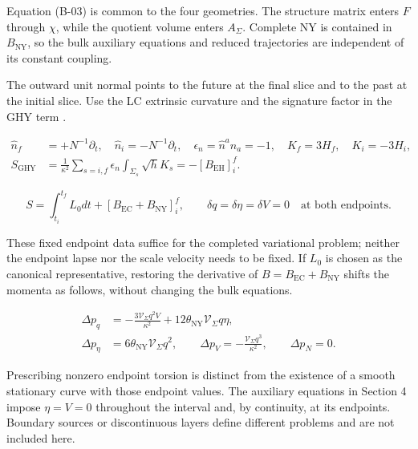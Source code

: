 Equation (B-03) is common to the four geometries. The structure matrix enters $F$ through $\chi$, while the quotient volume enters $A_{\Sigma}$. Complete NY is contained in $B_{\mathrm{NY}}$, so the bulk auxiliary equations and reduced trajectories are independent of its constant coupling.

The outward unit normal points to the future at the final slice and to the past at the initial slice. Use the LC extrinsic curvature and the signature factor in the GHY term \cite{GH1977,HH1996}.

\begin{equation}\tag{B-05}\label{eq:B-05}
\begin{aligned}
\hat n_f&=+N^{-1}\partial_t,\quad \hat n_i=-N^{-1}\partial_t,\quad
\epsilon_n=\hat n^a\hat n_a=-1,\quad K_f=3H_f,\quad K_i=-3H_i,\\
S_{\mathrm{GHY}}&=\frac1{\kappa^2}\sum_{s=i,f}\epsilon_n\int_{\Sigma_s}\sqrt h K_s
=-[B_{\mathrm{EH}}]_i^f.
\end{aligned}
\end{equation}

\begin{equation}\tag{B-06}\label{eq:B-06}
S=\int_{t_i}^{t_f}L_0dt+[B_{\mathrm{EC}}+B_{\mathrm{NY}}]_i^f,\qquad
\delta q=\delta\eta=\delta V=0\quad\text{at both endpoints}.
\end{equation}

These fixed endpoint data suffice for the completed variational problem; neither the endpoint lapse nor the scale velocity needs to be fixed. If $L_0$ is chosen as the canonical representative, restoring the derivative of $B=B_{\mathrm{EC}}+B_{\mathrm{NY}}$ shifts the momenta as follows, without changing the bulk equations.

\begin{equation}\tag{B-07}\label{eq:B-07}
\begin{aligned}
\Delta p_q&=-\frac{3\mathcal V_{\Sigma}q^2V}{\kappa^2}
+12\theta_{\mathrm{NY}}\mathcal V_{\Sigma}q\eta,\\
\Delta p_{\eta}&=6\theta_{\mathrm{NY}}\mathcal V_{\Sigma}q^2,\qquad
\Delta p_V=-\frac{\mathcal V_{\Sigma}q^3}{\kappa^2},\qquad \Delta p_N=0.
\end{aligned}
\end{equation}

Prescribing nonzero endpoint torsion is distinct from the existence of a smooth stationary curve with those endpoint values. The auxiliary equations in Section 4 impose $\eta=V=0$ throughout the interval and, by continuity, at its endpoints. Boundary sources or discontinuous layers define different problems and are not included here.

